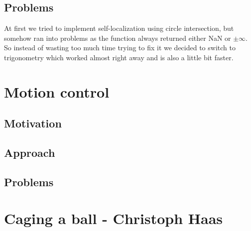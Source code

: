 \documentclass[703031]{iisreport}
\begin{document}
\subsection{Problems}
At first we tried to implement self-localization using circle intersection, but somehow ran into problems as the function always returned either NaN or $\pm \infty$. So instead of wasting too much time trying to fix it we decided to switch to trigonometry which worked almost right away and is also a little bit faster.

\section{Motion control}
\subsection{Motivation}

\subsection{Approach}

\subsection{Problems}


\section{Caging a ball - Christoph Haas}
\end{document}
